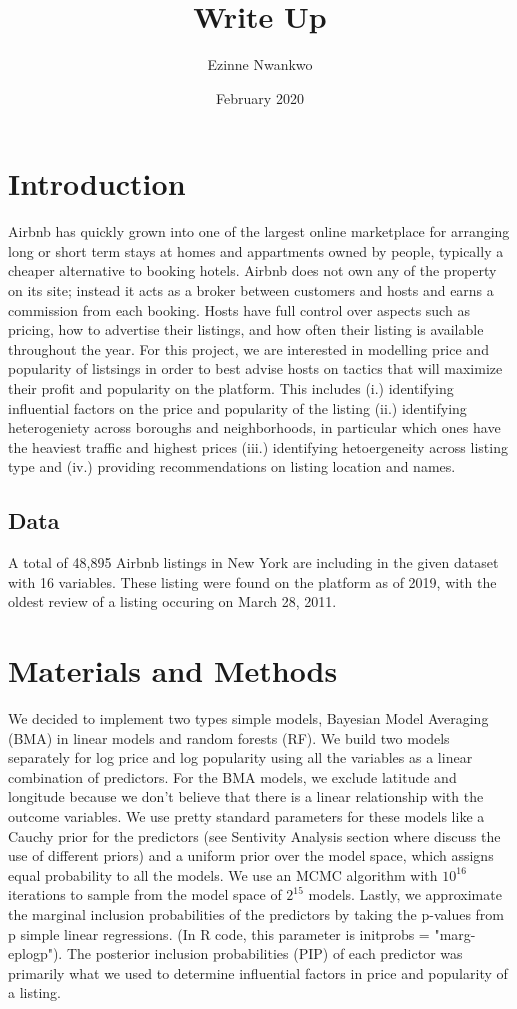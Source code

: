 \documentclass{article}
\title{Write Up }
\author{Ezinne Nwankwo}
\date{February 2020}
\begin{document}
\maketitle
\section{Introduction}

Airbnb has quickly grown into one of the largest online marketplace for arranging long or short term stays at homes and appartments owned by people, typically a cheaper alternative to booking hotels. Airbnb does not own any of the property on its site; instead it acts as a broker between customers and hosts and earns a commission from each booking. Hosts have full control over aspects such as pricing, how to advertise their listings, and how often their listing is available throughout the year. For this project, we are interested in modelling price and popularity of listsings in order to best advise hosts on tactics that will maximize their profit and popularity on the platform. This includes (i.) identifying influential factors on the price and popularity of the listing (ii.) identifying heterogeniety across boroughs and neighborhoods, in particular which ones have the heaviest traffic and highest prices (iii.) identifying hetoergeneity across listing type and (iv.) providing recommendations on listing location and names. 

\subsection{Data} 

A total of 48,895 Airbnb listings in New York are including in the given dataset with 16 variables. These listing were found on the platform as of 2019, with the oldest review of a listing occuring on March 28, 2011. 


\section{Materials and Methods} 

We decided to implement two types simple models, Bayesian Model Averaging (BMA) in linear models and random forests (RF). We build two models separately for log price and log popularity using all the variables as a linear combination of predictors. For the BMA models, we exclude latitude and longitude because we don't believe that there is a linear relationship with the outcome variables. We use pretty standard parameters for these models like a Cauchy prior for the predictors (see Sentivity Analysis section where discuss the use of different priors) and a uniform prior over the model space, which assigns equal probability to all the models. We use an MCMC algorithm with $10^{16}$ iterations to sample from the model space of $2^{15}$ models. Lastly, we approximate the marginal inclusion probabilities of the predictors by taking the p-values from p simple linear regressions. (In R code, this parameter is initprobs = "marg-eplogp"). The posterior inclusion probabilities (PIP) of each predictor was primarily what we used to determine influential factors in price and popularity of a listing. 
\end{document}
